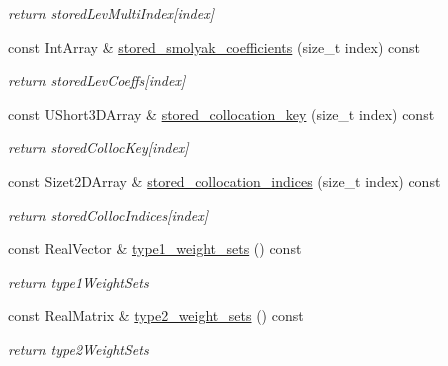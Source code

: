 \begin{DoxyCompactItemize}
\begin{DoxyCompactList}\small\item\em return stored\+Lev\+Multi\+Index\mbox{[}index\mbox{]} \end{DoxyCompactList}\item 
const Int\+Array \& \hyperlink{classPecos_1_1CombinedSparseGridDriver_ad592da1b660cbe11c9f2b2ee87cca855}{stored\+\_\+smolyak\+\_\+coefficients} (size\+\_\+t index) const \label{classPecos_1_1CombinedSparseGridDriver_ad592da1b660cbe11c9f2b2ee87cca855}

\begin{DoxyCompactList}\small\item\em return stored\+Lev\+Coeffs\mbox{[}index\mbox{]} \end{DoxyCompactList}\item 
const U\+Short3\+D\+Array \& \hyperlink{classPecos_1_1CombinedSparseGridDriver_a3b0e9e8086c8ac111469fa31b92ac8d6}{stored\+\_\+collocation\+\_\+key} (size\+\_\+t index) const \label{classPecos_1_1CombinedSparseGridDriver_a3b0e9e8086c8ac111469fa31b92ac8d6}

\begin{DoxyCompactList}\small\item\em return stored\+Colloc\+Key\mbox{[}index\mbox{]} \end{DoxyCompactList}\item 
const Sizet2\+D\+Array \& \hyperlink{classPecos_1_1CombinedSparseGridDriver_a2a42f69228dffaa10c86995cee0ff3c7}{stored\+\_\+collocation\+\_\+indices} (size\+\_\+t index) const \label{classPecos_1_1CombinedSparseGridDriver_a2a42f69228dffaa10c86995cee0ff3c7}

\begin{DoxyCompactList}\small\item\em return stored\+Colloc\+Indices\mbox{[}index\mbox{]} \end{DoxyCompactList}\item 
const Real\+Vector \& \hyperlink{classPecos_1_1CombinedSparseGridDriver_ae858d8bd4c244a98b0ff43c979b65e69}{type1\+\_\+weight\+\_\+sets} () const \label{classPecos_1_1CombinedSparseGridDriver_ae858d8bd4c244a98b0ff43c979b65e69}

\begin{DoxyCompactList}\small\item\em return type1\+Weight\+Sets \end{DoxyCompactList}\item 
const Real\+Matrix \& \hyperlink{classPecos_1_1CombinedSparseGridDriver_aacf52fa6f04443949a70c62ee3d718f7}{type2\+\_\+weight\+\_\+sets} () const \label{classPecos_1_1CombinedSparseGridDriver_aacf52fa6f04443949a70c62ee3d718f7}

\begin{DoxyCompactList}\small\item\em return type2\+Weight\+Sets \end{DoxyCompactList}\end{DoxyCompactItemize}

